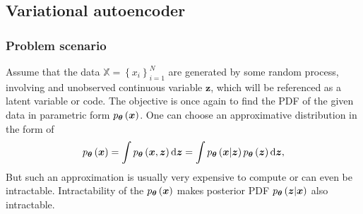 \subsection{Variational autoencoder}
\subsubsection{Problem scenario}
Assume that the data $\mathbb{X}=\left\lbrace x_i \right\rbrace^N_{i=1}$ are generated by some random process, involving and unobserved continuous variable $\boldsymbol{z}$, which will be referenced as a latent variable or code. The objective is once again to find the PDF of the given data in parametric form $p_{\boldsymbol{\theta}}\left(\boldsymbol{x}\right)$. One can choose an approximative distribution in the form of
\begin{equation}\label{eq:VAE_approxform}
p_{\boldsymbol{\theta}}\left(\boldsymbol{x}\right) = \int p_{\boldsymbol{\theta}}\left(\boldsymbol{x},  \boldsymbol{z}\right)\mathrm{d}{\boldsymbol{z}} =\int p_{\boldsymbol{\theta}}\left(\boldsymbol{x}\vert \boldsymbol{z}\right)p_{\boldsymbol{\theta}}\left(\boldsymbol{z}\right)\mathrm{d}{\boldsymbol{z}},
\end{equation}
But such an approximation is usually very expensive to compute or can even be intractable. Intractability of the $p_{\boldsymbol{\theta}}\left(\boldsymbol{x}\right)$ makes posterior PDF $p_{\boldsymbol{\theta}}\left(\boldsymbol{z}\vert\boldsymbol{x}\right)$ also intractable.

